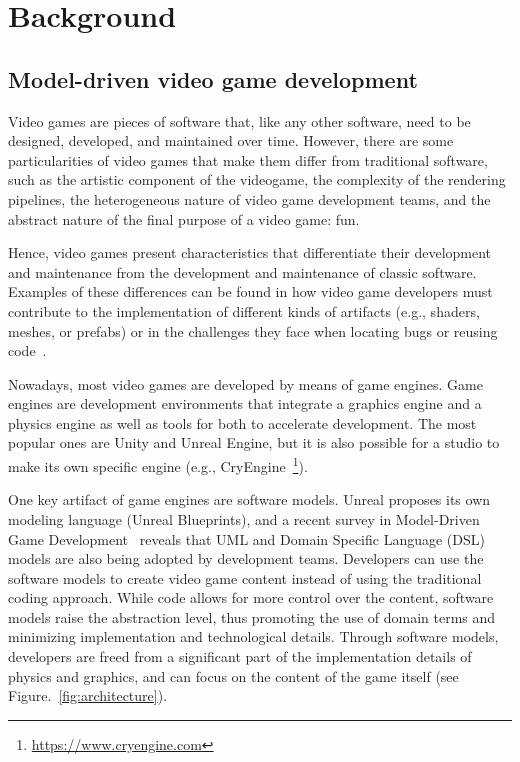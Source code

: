 \section{Background} \label{sec:Background}

\subsection{Model-driven video game development}

Video games are pieces of software that, like any other software, need to be designed, developed, and maintained over time. However, there are some particularities of video games that make them differ from traditional software, such as the artistic component of the videogame, the complexity of the rendering pipelines, the heterogeneous nature of video game development teams, and the abstract nature of the final purpose of a video game: fun. 

Hence, video games present characteristics that differentiate their development and maintenance from the development and maintenance of classic software. Examples of these differences can be found in how video game developers must contribute to the implementation of different kinds of artifacts (e.g., shaders, meshes, or prefabs) or in the challenges they face when locating bugs or reusing code~\cite{pascarella2018video, chueca2023consolidation}.

Nowadays, most video games are developed by means of game engines. Game engines are development environments that integrate a graphics engine and a physics engine as well as tools for both to accelerate development. The most popular ones are Unity and Unreal Engine, but it is also possible for a studio to make its own specific engine (e.g., CryEngine~\footnote{\url{https://www.cryengine.com}}). 

One key artifact of game engines are software models. Unreal proposes its own modeling language (Unreal Blueprints), and a recent survey in Model-Driven Game Development~\cite{zhu2019model} reveals that UML and Domain Specific Language (DSL) models are also being adopted by development teams. Developers can use the software models to create video game content instead of using the traditional coding approach. While code allows for more control over the content, software models raise the abstraction level, thus promoting the use of domain terms and minimizing implementation and technological details. Through software models, developers are freed from a significant part of the implementation details of physics and graphics, and can focus on the content of the game itself (see Figure.~\ref{fig:architecture}).

